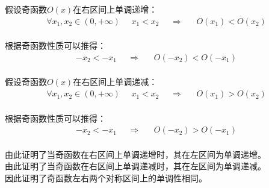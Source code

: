 \documentclass[UTF8]{ctexart}
\begin{document}
    假设奇函数$O(x)$在右区间上单调递增：
    \begin{align}
        \forall x_1,x_2\in (0,+\infty)~~~~~~x_1<x_2~~~~~~\Longrightarrow~~~~~~~O(x_1)<O(x_2)
    \end{align}\\
    根据奇函数性质可以推得：
    \begin{align}
        -x_2<-x_1~~~~~~\Longrightarrow~~~~~~~O(-x_2)<O(-x_1)
    \end{align}\\
    假设奇函数$O(x)$在右区间上单调递减：
    \begin{align}
        \forall x_1,x_2\in (0,+\infty)~~~~~~x_1<x_2~~~~~~\Longrightarrow~~~~~~~O(x_1)>O(x_2)
    \end{align}\\
    根据奇函数性质可以推得：
    \begin{align}
        -x_2<-x_1~~~~~~\Longrightarrow~~~~~~~O(-x_2)>O(-x_1)
    \end{align}\\
    由此证明了当奇函数在右区间上单调递增时，其在左区间为单调递增。\\[3mm]
    由此证明了当奇函数在右区间上单调递减时，其在左区间为单调递减。\\[3mm]
    因此证明了奇函数左右两个对称区间上的单调性相同。

\newpage
\end{document}

